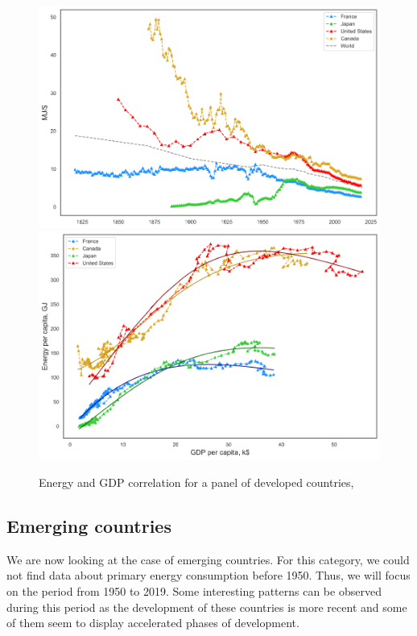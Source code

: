 \documentclass[conference]{IEEEtran}
\begin{document}
\begin{figure}
    \centering
    \includegraphics[scale = 0.23]{dev-int.png}
    \includegraphics[scale = 0.23]{s-curve-dev.png}
    \caption{Energy and GDP correlation for a panel of developed countries,\cite{bolt_maddison_2020} \cite{harvard_university_national_2021} \cite{noauthor_statistical_nodate} \cite{noauthor_annual_2009} }
    \label{correldev}
\end{figure}

\subsection{Emerging countries}
We are now looking at the case of emerging countries. For this category, we could not find data about primary energy consumption before 1950. Thus, we will focus on the period from 1950 to 2019. Some interesting patterns can be observed during this period as the development of these countries is more recent and some of them seem to display accelerated phases of development.
\end{document}
